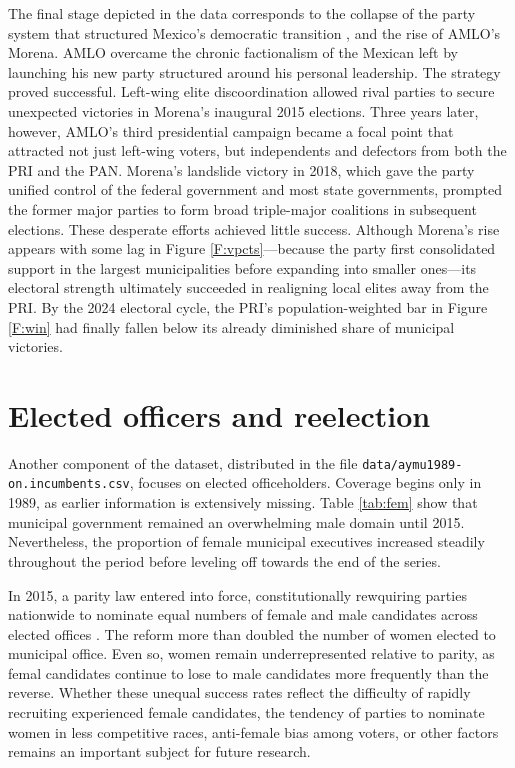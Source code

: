 \documentclass[letter,12pt]{article}
\begin{document}
The final stage depicted in the data corresponds to the collapse of the party system that structured Mexico's democratic transition \citep{moreno.decisElec.2009}, and the rise of AMLO's Morena. AMLO overcame the chronic factionalism of the Mexican left \citep{bruhn.1997} by launching his new party structured around his personal leadership. The strategy proved successful. Left-wing elite discoordination allowed rival parties to secure unexpected victories in Morena's inaugural 2015 elections. Three years later, however, AMLO's third presidential campaign became a focal point that attracted not just left-wing voters, but independents and defectors from both the PRI and the PAN. Morena's landslide victory in 2018, which gave the party unified control of the federal government and most state governments, prompted the former major parties to form  broad triple-major coalitions in subsequent elections. These desperate efforts achieved little success. Although Morena's rise appears with some lag in Figure \ref{F:vpcts}---because the party first consolidated support in the largest municipalities before expanding into smaller ones---its electoral strength ultimately succeeded in realigning local elites away from the PRI. By the 2024 electoral cycle, the PRI's population-weighted bar in Figure \ref{F:win} had finally fallen below its already diminished share of municipal victories.

\section{Elected officers and reelection}\label{S:incumbents}

Another component of the dataset, distributed in the file \verb|data/aymu1989-on.incumbents.csv|, focuses on elected officeholders. Coverage begins only in 1989, as earlier information is extensively missing. Table \ref{tab:fem} show that municipal government remained an overwhelming male domain until 2015. Nevertheless, the proportion of female municipal executives increased steadily throughout the period before leveling off towards the end of the series.

In 2015, a parity law entered into force, constitutionally rewquiring parties nationwide to nominate equal numbers of female and male candidates across elected offices \citep{piscopo.2016}. The reform more than doubled the number of women elected to municipal office. Even so, women remain underrepresented relative to parity, as femal candidates continue to lose to male candidates more frequently than the reverse. Whether these unequal success rates reflect the difficulty of rapidly recruiting experienced female candidates, the tendency of parties to nominate women in less competitive races, anti-female bias among voters, or other factors remains an important subject for future research. 
\end{document}
